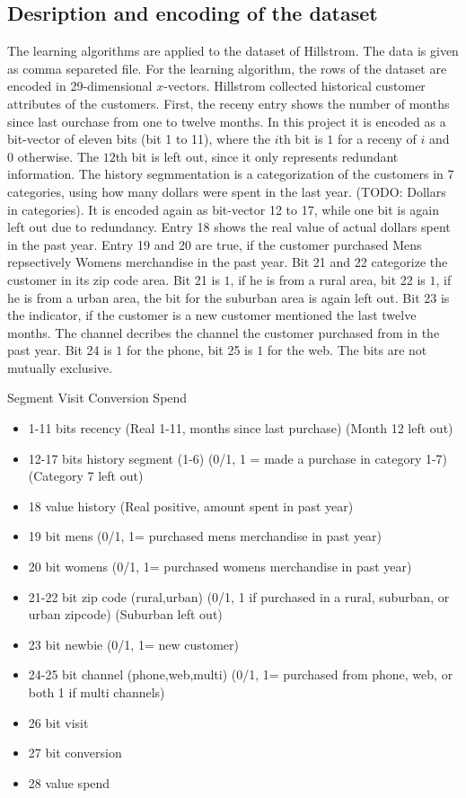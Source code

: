 \documentclass[10pt,twocolumn,letterpaper]{article}
\begin{document}
\subsection{Desription and encoding of the dataset}
The learning algorithms are applied to the dataset of Hillstrom. The data is given as comma separeted file.
For the learning algorithm, the rows of the dataset are encoded in 29-dimensional $x$-vectors.
Hillstrom collected historical customer attributes of the customers.
First, the receny entry shows the number of months since last ourchase from one to twelve months. In this project it is encoded as a bit-vector of eleven bits (bit 1 to 11), where the $i$th bit is $1$ for a receny of $i$ and $0$ otherwise. The $12$th bit is left out, since it only represents redundant information.
The history segmmentation is a categorization of the customers in 7 categories, using how many dollars were spent in the last year.
(TODO: Dollars in categories). It is encoded again as bit-vector 12 to 17, while one bit is again left out due to redundancy.
Entry 18 shows the real value of actual dollars spent in the past year. Entry 19 and 20 are true, if the customer purchased Mens repsectively  Womens merchandise in the past year. Bit 21 and 22 categorize the customer in its zip code area. Bit 21 is $1$, if he is from a rural area, bit 22 is $1$, if he is from a urban area, the bit for the suburban area is again left out.
Bit 23 is the indicator, if the customer is a new customer mentioned the last twelve months.
The channel decribes the channel the customer purchased  from  in the past year. Bit 24 is $1$ for the phone, bit 25 is $1$ for the web. The bits are not mutually exclusive. 

Segment
Visit
Conversion
Spend

\begin{itemize}
\item 1-11 bits recency (Real 1-11, months since last purchase)  (Month 12 left out)
\item 12-17 bits history segment (1-6) (0/1, 1 = made a purchase in category 1-7)   (Category 7 left out)
\item  18 value history (Real positive, amount spent in past year)
\item  19 bit mens (0/1, 1= purchased mens merchandise in past year)
\item  20 bit womens (0/1, 1= purchased womens merchandise in past year)
\item  21-22 bit zip code (rural,urban) (0/1, 1 if purchased in a rural, suburban, or urban zipcode)  (Suburban left out)
\item  23 bit newbie (0/1, 1= new customer)
\item  24-25 bit channel (phone,web,multi) (0/1, 1= purchased from phone, web, or both 1 if multi channels)
\item 26 bit visit
\item 27 bit conversion
\item 28 value spend
\end{itemize}
\end{document}
